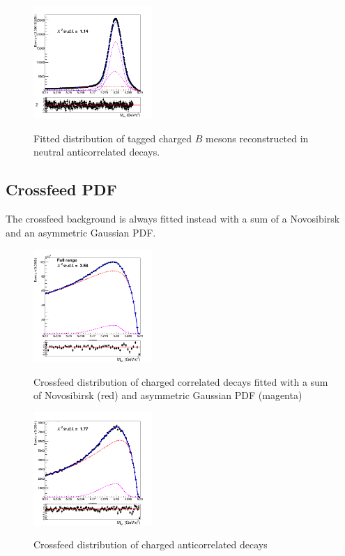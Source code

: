 \begin{figure}[H]
\centering
{\includegraphics[width=0.40\textwidth]{05-BtagFit/figs/stream0_neutralBtag_anticorrLambdaC_TotalSignal_addedGaussian.png}}
\caption{Fitted distribution of tagged charged $B$ mesons reconstructed in neutral anticorrelated decays. }
\label{fig:stream0_neutralBtag_anticorrLambdaC_TotalSignal_addedGaussian}
\end{figure}
                        

\subsection{Crossfeed PDF}
 
The crossfeed background is always fitted instead with a sum of a Novosibirsk and an asymmetric Gaussian PDF. 

\begin{figure}[h!]
\centering
{\includegraphics[width=0.40\textwidth]{05-BtagFit/figs/NeutralCrossfeed_stream0_corrLambdaC_chargedBtagFit.png}}
\caption{Crossfeed distribution of charged correlated decays fitted with a sum of Novosibirsk (red) and asymmetric Gaussian PDF (magenta)}
\label{fig:NeutralCrossfeed_stream0_corrLambdaC_chargedBtagFit}
\end{figure}

\begin{figure}[h!]
\centering
{\includegraphics[width=0.40\textwidth]{05-BtagFit/figs/NeutralCrossfeed_stream0_anticorrLambdaC_chargedBtag_MbcFit.png}}
\caption{Crossfeed distribution of charged anticorrelated decays}
\label{fig:NeutralCrossfeed_stream0_corrLambdaC_chargedBtagFit}
\end{figure}

